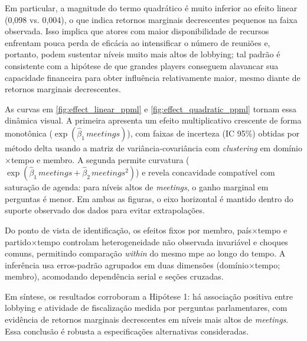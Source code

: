 Em particular, a magnitude do termo quadrático é muito inferior ao efeito linear (0,098 vs. 0,004), o que indica retornos marginais decrescentes pequenos na faixa observada. Isso implica que atores com maior disponibilidade de recursos enfrentam pouca perda de eficácia ao intensificar o número de reuniões e, portanto, podem sustentar níveis muito mais altos de lobbying; tal padrão é consistente com a hipótese de que grandes players conseguem alavancar sua capacidade financeira para obter influência relativamente maior, mesmo diante de retornos marginais decrescentes.


As curvas em \autoref{fig:effect_linear_ppml} e \autoref{fig:effect_quadratic_ppml} tornam essa dinâmica visual. A primeira apresenta um efeito multiplicativo crescente de forma monotônica (\(\exp(\hat{\beta}_1\,\allowbreak\textit{meetings})\)), com faixas de incerteza (IC 95\%) obtidas por método delta usando a matriz de variância-covariância com \textit{clustering} em domínio$\times$tempo e membro. A segunda permite curvatura (\(\exp(\hat{\beta}_1\,\allowbreak\textit{meetings}+\hat{\beta}_2\,\allowbreak\textit{meetings}^2)\)) e revela concavidade compatível com saturação de agenda: para níveis altos de \textit{meetings}, o ganho marginal em perguntas é menor. Em ambas as figuras, o eixo horizontal é mantido dentro do suporte observado dos dados para evitar extrapolações.

Do ponto de vista de identificação, os efeitos fixos por membro, país$\times$tempo e partido$\times$tempo controlam heterogeneidade não observada invariável e choques comuns, permitindo comparação \textit{within} do mesmo \acrshort{mpe} ao longo do tempo. A inferência usa erros-padrão agrupados em duas dimensões (domínio$\times$tempo; membro), acomodando dependência serial e seções cruzadas.

Em síntese, os resultados corroboram a Hipótese 1: há associação positiva entre lobbying e atividade de fiscalização medida por perguntas parlamentares, com evidência de retornos marginais decrescentes em níveis mais altos de \textit{meetings}. Essa conclusão é robusta a especificações alternativas consideradas.

